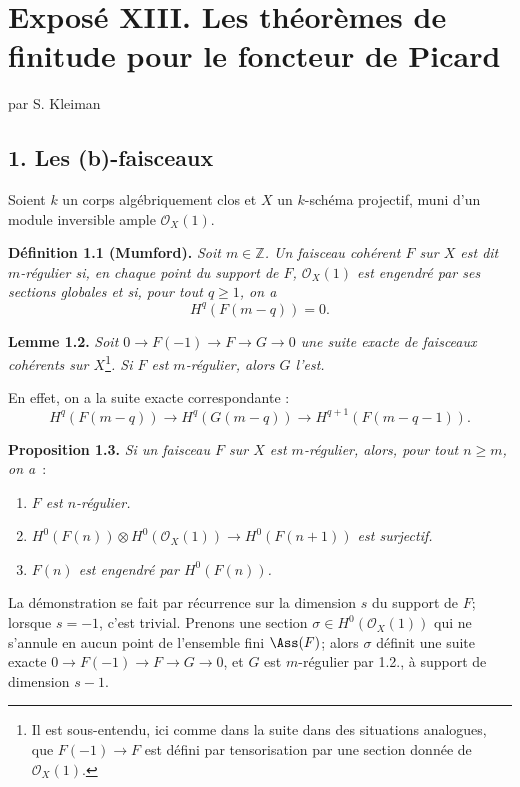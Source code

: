 \providecommand{\Pictau}{\operatorname{Pic}^{\tau}}
\providecommand{\length}{\operatorname{length}}
\providecommand{\etale}{\text{\'etale}}


\section*{Expos\'e XIII. Les th\'eor\`emes de finitude pour le foncteur de Picard}
\begin{center}
par S. Kleiman
\end{center}

\subsection*{1. Les (b)-faisceaux}
Soient $k$ un corps alg\'ebriquement clos et $X$ un $k$-sch\'ema projectif, muni d'un module inversible ample $\mathcal O_X(1)$.

\textbf{D\'efinition 1.1 (Mumford).} \emph{Soit $m\in\mathbb Z$. Un faisceau coh\'erent $F$ sur $X$ est dit \emph{$m$-r\'egulier} si, en chaque point du support de $F$, $\mathcal O_X(1)$ est engendr\'e par ses sections globales et si, pour tout $q\ge1$, on a}
\[
 H^q(F(m-q))=0.
\]

\textbf{Lemme 1.2.} \emph{Soit \(0\longrightarrow F(-1)\longrightarrow F\longrightarrow G\longrightarrow 0\) une suite exacte de faisceaux coh\'erents sur $X$}\footnote{Il est sous-entendu, ici comme dans la suite dans des situations analogues, que \(F(-1)\to F\) est d\'efini par tensorisation par une section donn\'ee de \(\mathcal O_X(1)\).}\emph{. Si $F$ est $m$-r\'egulier, alors $G$ l'est.}

En effet, on a la suite exacte correspondante :
\[
H^q(F(m-q))\longrightarrow H^q(G(m-q))\longrightarrow H^{q+1}(F(m-q-1)).
\]

\textbf{Proposition 1.3.} \emph{Si un faisceau $F$ sur $X$ est $m$-r\'egulier, alors, pour tout $n\ge m$, on a}~:
\begin{enumerate}[label=(\roman*)]
\item \emph{$F$ est $n$-r\'egulier.}
\item \emph{\(H^0(F(n))\otimes H^0(\mathcal O_X(1))\longrightarrow H^0(F(n+1))\) est surjectif.}
\item \emph{$F(n)$ est engendr\'e par \(H^0(F(n))\).}
\end{enumerate}

La
démonstration se fait par récurrence sur la dimension \(s\) du support de \(F\); lorsque \(s=-1\), c'est trivial. Prenons une section \(\sigma\in H^0(\mathcal O_X(1))\) qui ne s'annule en aucun point de l'ensemble fini \(\Ass(F)\); alors \(\sigma\) définit une suite exacte \(0\longrightarrow F(-1)\longrightarrow F\longrightarrow G\longrightarrow 0\), et \(G\) est \(m\)-régulier par 1.2., à support de dimension \(s-1\).

